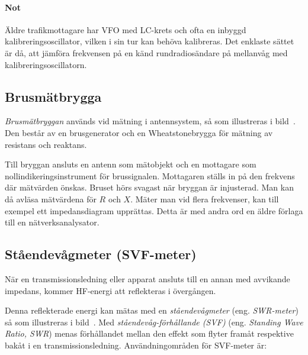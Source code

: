 \paragraph{Not}
Äldre trafikmottagare har VFO med LC-krets och ofta en inbyggd
kalibreringsoscillator, vilken i sin tur kan behöva kalibreras.
Det enklaste sättet är då, att jämföra frekvensen på en känd rundradiosändare
på mellanvåg med kalibreringsoscillatorn.

\subsection{Brusmätbrygga}


\emph{Brusmätbryggan} används vid mätning i antennsystem, så som illustreras i
bild~.
Den består av en brusgenerator och en Wheatstonebrygga för mätning av
resistans och reaktans.

Till bryggan ansluts en antenn som mätobjekt och en mottagare som
nollindikeringsinstrument för brussignalen.
Mottagaren ställs in på den frekvens där mätvärden önskas.
Bruset hörs svagast när bryggan är injusterad.
Man kan då avläsa mätvärdena för \(R\) och \(X\).
Mäter man vid flera frekvenser, kan till exempel ett impedansdiagram upprättas.
Detta är med andra ord en äldre förlaga till en nätverksanalysator.

\subsection{Ståendevågmeter (SVF-meter)}
\label{SVF}


När en transmissionsledning eller apparat ansluts till en annan med
avvikande impedans, kommer HF-energi att reflekteras i övergången.

Denna reflekterade energi kan mätas med en \emph{ståendevågmeter}
(eng. \emph{SWR-meter}) så som illustreras i bild~.
Med \emph{ståendevåg-förhållande (SVF)} (eng. \emph{Standing Wave Ratio, SWR})
menas förhållandet mellan den effekt som flyter framåt respektive bakåt i en
transmissionsledning.
Användningområden för SVF-meter är:

